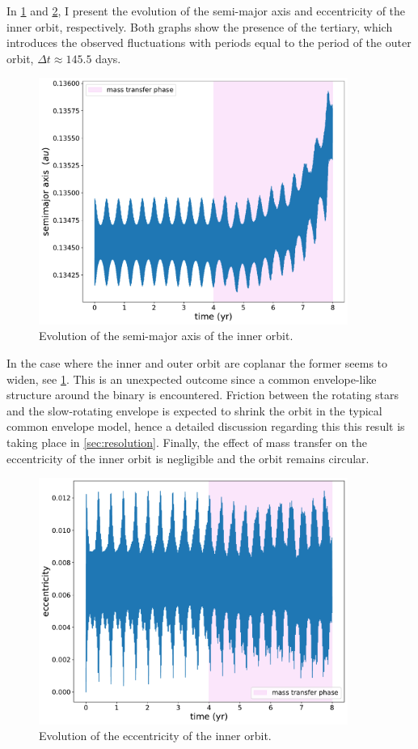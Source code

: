 In \cref{fig:accretion_inc_00_inner_semimajor_axis} and \cref{fig:accretion_inc_00_inner_ecc}, I present the evolution of the semi-major axis and eccentricity of the inner orbit, 
respectively. Both graphs show the presence of the tertiary, which introduces the observed fluctuations with periods equal to the period of the outer orbit, $\Delta t \approx 145.5$ days.
\begin{figure}[H]
    \centering
    \includegraphics[width=0.9\textwidth]{Thesis/graphs/inc_00/accretion_inc_00_inner_semimajor_axis.pdf}
    \caption{Evolution of the semi-major axis of the inner orbit.}
    \label{fig:accretion_inc_00_inner_semimajor_axis}
\end{figure}
In the case where the inner and outer orbit are coplanar the former seems to widen, see \cref{fig:accretion_inc_00_inner_semimajor_axis}. This is an unexpected outcome since a common envelope-like structure around the binary is encountered. Friction between the rotating stars and the slow-rotating envelope is expected to shrink the orbit in the typical common envelope model, hence a detailed discussion regarding this this result is taking place in \cref{sec:resolution}. Finally, the effect of mass transfer on the eccentricity of the inner orbit is negligible and the orbit remains circular. 
\begin{figure}[!htb]
    \centering
    \includegraphics[width=0.9\textwidth]{Thesis/graphs/inc_00/accretion_inc_00_inner_ecc.pdf}
    \caption{Evolution of the eccentricity of the inner orbit.}
    \label{fig:accretion_inc_00_inner_ecc}
\end{figure}


